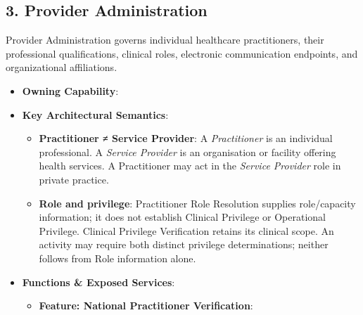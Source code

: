 \par\smallskip
{}\label{rad:em:82}
\subsection*{3. Provider Administration}
\label{rad:em:84}

Provider Administration governs individual healthcare practitioners, their professional qualifications, clinical roles, electronic communication endpoints, and organizational affiliations.

\label{rad:em:86}

\begin{itemize}

\item 
\textbf{Owning Capability}: \texttt{}



\item 
\textbf{Key Architectural Semantics}:


\begin{itemize}

\item 
\textbf{Practitioner ≠ Service Provider}: A \emph{Practitioner} is an individual professional. A \emph{Service Provider} is an organisation or facility offering health services. A Practitioner may act in the \emph{Service Provider} role in private practice.



\item 
\textbf{Role and privilege}: Practitioner Role Resolution supplies role/\allowbreak{}capacity information; it does not establish Clinical Privilege or Operational Privilege. Clinical Privilege Verification retains its clinical scope. An activity may require both distinct privilege determinations; neither follows from Role information alone.



\end{itemize}


\item 
\textbf{Functions \& Exposed Services}:


\begin{itemize}

\item 
\textbf{Feature: National Practitioner Verification}:


\begin{itemize}


\end{itemize}
\end{itemize}
\end{itemize}
